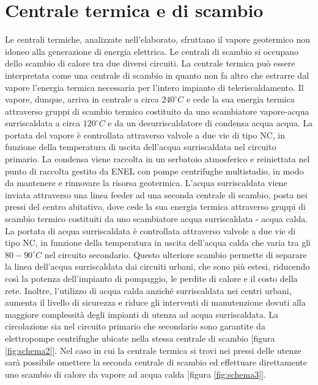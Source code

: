 \documentclass[laurea,oneside,11pt]{USiena_tesiLM}
\begin{document}
\section{Centrale termica e di scambio}
Le centrali termiche, analizzate nell'elaborato, sfruttano il vapore geotermico non idoneo alla generazione di energia elettrica. Le centrali di scambio si occupano dello scambio di calore tra due diversi circuiti. La centrale termica può essere interpretata come una centrale di scambio in quanto non fa altro che estrarre dal vapore l'energia termica necessaria per l'intero impianto di teleriscaldamento. Il vapore, dunque, arriva in centrale a circa $240 ^{\circ}C$ e cede la sua energia termica attraverso gruppi di scambio termico costituito da uno scambiatore vapore-acqua surriscaldata a circa $120 ^{\circ}C$ e da un desurriscaldatore di condensa acqua acqua. La portata del vapore è controllata attraverso  valvole a due vie di tipo NC, in funzione della temperatura  di uscita dell'acqua surriscaldata nel circuito primario. La condensa viene raccolta in un serbatoio atmosferico e reiniettata nel punto di raccolta gestito da ENEL con pompe centrifughe multistadio, in modo da mantenere e rinnovare la risorsa geotermica. L'acqua surriscaldata viene inviata attraverso una linea feeder ad una seconda centrale di scambio, posta nei pressi del centro abitativo, dove cede la sua energia termica attraverso gruppi di scambio termico costituiti da uno scambiatore acqua surriscaldata - acqua calda. La portata di acqua surriscaldata è controllata attraverso valvole a due vie di tipo NC, in funzione della temperatura in uscita dell'acqua calda che varia tra gli $80-90 ^{\circ}C$ nel circuito secondario. Questo ulteriore scambio permette di separare la linea dell'acqua surriscaldata  dai circuiti urbani, che sono più estesi, riducendo così la potenza dell'impianto di pompaggio, le perdite di calore e il costo della rete. Inoltre, l'utilizzo di acqua calda anziché surriscaldata nei centri urbani, aumenta il livello di sicurezza e riduce gli interventi di manutenzione dovuti alla maggiore complessità degli impianti di utenza ad acqua surriscaldata. La circolazione sia nel circuito primario che secondario sono garantite da elettropompe centrifughe ubicate nella stessa centrale di scambio [figura \ref{fig:schema2}].
Nel caso in cui la centrale termica si trovi nei pressi delle utenze sarà possibile omettere la seconda centrale di scambio ed effettuare direttamente uno scambio di calore da vapore ad acqua calda [figura \ref{fig:schema3}].
\end{document}
